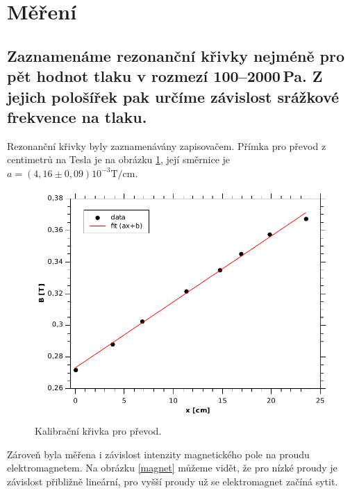 \documentclass[12pt]{article}
\begin{document}
\section{Měření}
\subsection{Zaznamenáme rezonanční křivky nejméně pro pět hodnot tlaku v rozmezí 100--2000\,Pa. Z jejich pološířek pak určíme závislost srážkové frekvence na tlaku.}

Rezonanční křivky byly zaznamenávány zapisovačem. Přímka pro převod z centimetrů na Tesla je na obrázku \ref{prevod}, její směrnice je $a = (4,16 \pm 0,09)10^{-3} \mathrm{ T/cm}$. 

\begin{figure}[!htbp]
\begin{center}
\includegraphics[width=12cm]{Graph2.pdf}
\caption{Kalibrační křivka pro převod.}
\label{prevod}
\end{center}
\end{figure}

Zároveň byla měřena i závislost intenzity magnetického pole na proudu elektromagnetem. Na obrázku \ref{magnet} můžeme vidět, že pro nízké proudy je závislost přibližně lineární, pro vyšší proudy už se elektromagnet začíná sytit.
\end{document}
